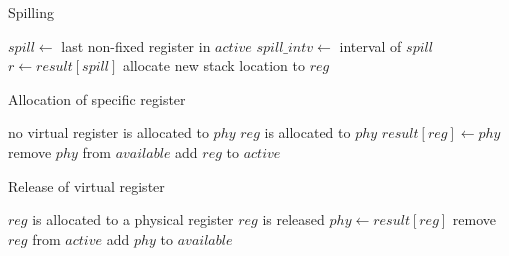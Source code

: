 \documentclass[../main.tex]{subfiles}
\begin{document}
\begin{algorithm}
\caption{Spilling}\label{algspill}
\begin{algorithmic}[1]
  \State $spill \gets$ last non-fixed register in $active$ 
  \State $spill\_intv \gets$ interval of $spill$
    \State $r \gets result[spill]$
    \State {}
    \State {}
  \Else
    \State {}
  \EndIf
\EndProcedure
{}
    \State {}
  \EndIf
  \State allocate new stack location to $reg$
\EndProcedure
\end{algorithmic}
\end{algorithm}

\begin{algorithm}
\caption{Allocation of specific register}\label{algallocreg}
\begin{algorithmic}[1]
  \Require no virtual register is allocated to $phy$
  \Ensure $reg$ is allocated to $phy$
  \State $result[reg] \gets phy$
  \State remove $phy$ from $available$
  \State add $reg$ to $active$ 
\EndProcedure
\end{algorithmic}
\end{algorithm}

\begin{algorithm}
\caption{Release of virtual register}\label{algreleasereg}
\begin{algorithmic}[1]
  \Require $reg$ is allocated to a physical register
  \Ensure $reg$ is released
  \State $phy \gets result[reg]$
  \State remove $reg$ from $active$
  \State add $phy$ to $available$ 
  \EndProcedure
\end{algorithmic}
\end{algorithm}
\end{document}
